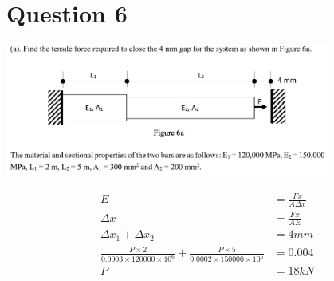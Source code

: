 \documentclass{article}
\begin{document}
\newcommand{\documentcourse}{ENGG1300}
\newcommand{\documentnumber}{2}





\section*{Question 6}
\begin{center}
    \includegraphics[width=0.8\textwidth]{img/2-1.jpg}
\end{center}
\begin{align*}
    E                                                                                                & =\frac{Fx}{A\Delta x} \\
    \Delta x                                                                                         & = \frac{Fx}{AE}       \\
    \Delta x_1 + \Delta x_2                                                                          & = 4mm                 \\
    \frac{P\times 2}{0.0003\times 120000\times 10^6}+\frac{P\times 5}{0.0002\times 150000\times10^6} & =0.004                \\
    P                                                                                                & = 18kN
\end{align*}
\end{document}
